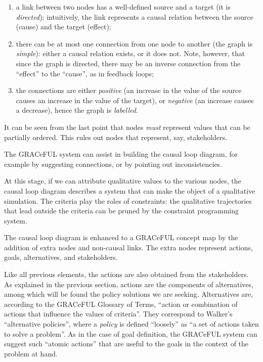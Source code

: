 \begin{enumerate}
\def\labelenumi{\alph{enumi}.}
\item
  a link between two nodes has a well-defined source and a target (it is
  \emph{directed}); intuitively, the link represents a causal relation
  between the source (cause) and the target (effect);
\item
  there can be at most one connection from one node to another (the
  graph is \emph{simple}): either a causal relation exists, or it does
  not. Note, however, that since the graph is directed, there may be an
  inverse connection from the ``effect'' to the ``cause'', as in
  feedback loops;
\item
  the connections are either \emph{positive} (an increase in the value
  of the source causes an increase in the value of the target), or
  \emph{negative} (an increase causes a decrease), hence the graph is
  \emph{labelled}.
\end{enumerate}

It can be seen from the last point that nodes \emph{must} represent
values that can be partially ordered. This rules out nodes that
represent, say, stakeholders.

The GRACeFUL system can assist in building the causal loop diagram, for
example by suggesting connections, or by pointing out inconsistencies.

At this stage, if we can attribute qualitative values to the various
nodes, the causal loop diagram describes a system that can make the
object of a qualitative simulation. The criteria play the roles of
constraints: the qualitative trajectories that lead outside the criteria
can be pruned by the constraint programming system.

The causal loop diagram is enhanced to a GRACeFUL concept map by the
addition of extra nodes and non-causal links. The extra nodes represent
actions, goals, alternatives, and stakeholders.

Like all previous elements, the actions are also obtained from the
stakeholders. As explained in the previous section, actions are the
components of alternatives, among which will be found the policy
solutions we are seeking. Alternatives are, according to the GRACeFUL
Glossary of Terms, ``action or combination of actions that influence the
values of criteria''. They correspond to Walker's ``alternative
policies'', where a \emph{policy} is defined ``loosely'' as ``a set of
actions taken to solve a problem''. As in the case of goal definition,
the GRACeFUL system can suggest such ``atomic actions'' that are useful
to the goals in the context of the problem at hand.

